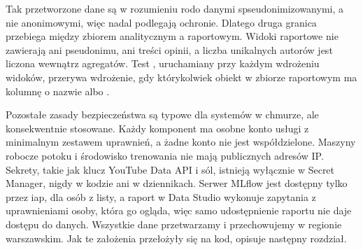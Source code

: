 Tak przetworzone dane są w rozumieniu \ac{rodo} danymi spseudonimizowanymi, a nie anonimowymi, więc nadal podlegają ochronie.
Dlatego druga granica przebiega między zbiorem analitycznym a raportowym.
Widoki raportowe nie zawierają ani pseudonimu, ani treści opinii, a liczba unikalnych autorów jest liczona wewnątrz agregatów.
Test , uruchamiany przy każdym wdrożeniu widoków, przerywa wdrożenie, gdy którykolwiek obiekt w zbiorze raportowym ma kolumnę o nazwie  albo .

Pozostałe zasady bezpieczeństwa są typowe dla systemów w chmurze, ale konsekwentnie stosowane.
Każdy komponent ma osobne konto usługi z minimalnym zestawem uprawnień, a żadne konto nie jest współdzielone.
Maszyny robocze potoku i środowisko trenowania nie mają publicznych adresów IP.
Sekrety, takie jak klucz YouTube Data API i sól, istnieją wyłącznie w Secret Manager, nigdy w kodzie ani w dziennikach.
Serwer MLflow jest dostępny tylko przez \ac{iap}, dla osób z listy, a raport w Data Studio wykonuje zapytania z uprawnieniami osoby, która go ogląda, więc samo udostępnienie raportu nie daje dostępu do danych.
Wszystkie dane przetwarzamy i przechowujemy w regionie warszawskim.
Jak te założenia przełożyły się na kod, opisuje następny rozdział.
